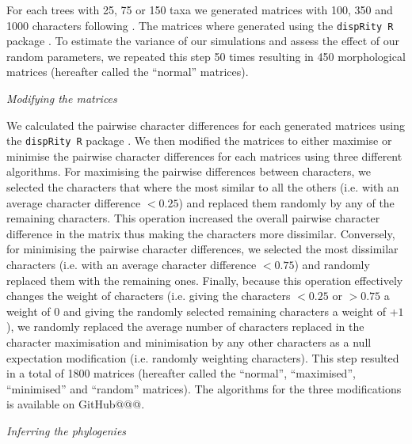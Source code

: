\documentclass[12pt,letterpaper]{article}
\renewcommand{\subsection}[1]{%
\bigskip
\begin{center}
\begin{large}
\normalfont\itshape #1
\end{large}
\end{center}}
\begin{document}
For each trees with 25, 75 or 150 taxa we generated matrices with 100, 350 and 1000 characters following \cite{OReilly20160081}.
The matrices where generated using the \texttt{dispRity R} package \citep[][; \url{https://github.com/TGuillerme/dispRity}]{thomas_guillerme_2016_55646}.
To estimate the variance of our simulations and assess the effect of our random parameters, we repeated this step 50 times resulting in 450 morphological matrices (hereafter called the ``normal'' matrices).

\subsection{Modifying the matrices}

We calculated the pairwise character differences for each generated matrices using the \texttt{dispRity R} package \citep[][; \url{https://github.com/TGuillerme/dispRity}]{thomas_guillerme_2016_55646}. %
We then modified the matrices to either maximise or minimise the pairwise character differences for each matrices using three different algorithms.
For maximising the pairwise differences between characters, we selected the characters that where the most similar to all the others (i.e. with an average character difference $<$$0.25$) and replaced them randomly by any of the remaining characters.
This operation increased the overall pairwise character difference in the matrix thus making the characters more dissimilar.
Conversely, for minimising the pairwise character differences, we selected the most dissimilar characters (i.e. with an average character difference $<$$0.75$) and randomly replaced them with the remaining ones.
Finally, because this operation effectively changes the weight of characters (i.e. giving the characters $<$$0.25$ or $>$$0.75$ a weight of $0$ and giving the randomly selected remaining characters a weight of +$1$), we randomly replaced the average number of characters replaced in the character maximisation and minimisation by any other characters as a null expectation modification (i.e. randomly weighting characters).
This step resulted in a total of 1800 matrices (hereafter called the ``normal'', ``maximised'', ``minimised'' and ``random'' matrices).
The algorithms for the three modifications is available on GitHub@@@. %

\subsection{Inferring the phylogenies}
\end{document}
